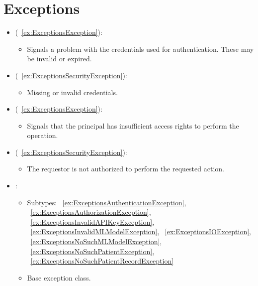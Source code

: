 \section{Exceptions}\label{sec:exceptions}
\begin{itemize}[nolistsep,noitemsep]
\item {} (\iconinher{}~\ref{ex:ExceptionsException}): 
\begin{itemize}[noitemsep,nolistsep]

\item[] Signals a problem with the credentials used for authentication. These may be invalid or expired.
\end{itemize}

\item {} (\iconinher{}~\ref{ex:ExceptionsSecurityException}): 
\begin{itemize}[noitemsep,nolistsep]

\item[] Missing or invalid credentials.
\end{itemize}

\item {} (\iconinher{}~\ref{ex:ExceptionsException}): 
\begin{itemize}[noitemsep,nolistsep]

\item[] Signals that the principal has insufficient access rights to perform the operation.
\end{itemize}

\item {} (\iconinher{}~\ref{ex:ExceptionsSecurityException}): 
\begin{itemize}[noitemsep,nolistsep]

\item[] The requestor is not authorized to perform the requested action.
\end{itemize}

\item {}: 
\begin{itemize}[noitemsep,nolistsep]
\item[] Subtypes: \iconinher{}~\ref{ex:ExceptionsAuthenticationException}, \iconinher{}~\ref{ex:ExceptionsAuthorizationException}, \iconinher{}~\ref{ex:ExceptionsInvalidAPIKeyException}, \iconinher{}~\ref{ex:ExceptionsInvalidMLModelException}, \iconinher{}~\ref{ex:ExceptionsIOException}, \iconinher{}~\ref{ex:ExceptionsNoSuchMLModelException}, \iconinher{}~\ref{ex:ExceptionsNoSuchPatientException}, \iconinher{}~\ref{ex:ExceptionsNoSuchPatientRecordException}
\item[] Base exception class.
\end{itemize}


\end{itemize}
